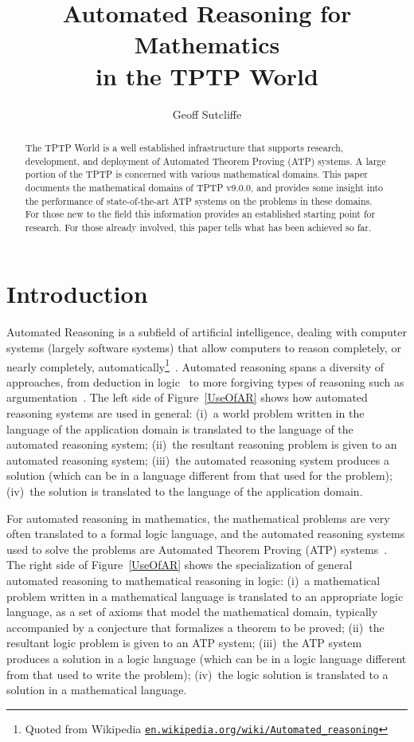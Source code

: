 \documentclass[runningheads]{llncs}
\title{Automated Reasoning for Mathematics \\ in the TPTP World}
\author{
  Geoff Sutcliffe\orcidID{0000-0001-9120-3927}\Envelope
}
\institute{
  University of Miami,
  Miami, USA\\
  \email{geoff@cs.miami.edu}\\
}
\begin{document}
\maketitle

\begin{abstract}
The TPTP World is a well established infrastructure that supports research, development, and 
deployment of Automated Theorem Proving (ATP) systems.
A large portion of the TPTP is concerned with various mathematical domains.
This paper documents the mathematical domains of TPTP v9.0.0, and provides some insight into 
the performance of state-of-the-art ATP systems on the problems in these domains.
For those new to the field this information provides an established starting point for research.
For those already involved, this paper tells what has been achieved so far.
\end{abstract}
\section{Introduction}
\label{Introduction}

Automated Reasoning is a subfield of artificial intelligence, dealing with computer systems
(largely software systems) that allow computers to reason completely, or nearly completely, 
automatically\footnote{%
Quoted from Wikipedia \href{https://en.wikipedia.org/wiki/Automated_reasoning}{{\tt en.wikipedia.org/wiki/Automated\_reasoning}}}~\cite{RV01-HAR}.
Automated reasoning spans a diversity of approaches, from deduction in logic~\cite{Gal15} to more 
forgiving types of reasoning such as argumentation~\cite{vE+14}.
The left side of Figure~\ref{UseOfAR} shows how automated reasoning systems are used in general: 
(i)~a world problem written in the language of the application domain is translated to the language
of the automated reasoning system; (ii)~the resultant reasoning problem is given to an automated 
reasoning system; (iii)~the automated reasoning system produces a solution (which can be in a
language different from that used for the problem); (iv)~the solution is translated to the 
language of the application domain.

For automated reasoning in mathematics, the mathematical problems are very often translated to 
a formal logic language, and the automated reasoning systems used to solve the problems are 
Automated Theorem Proving (ATP) systems~\cite{Bun83,RV01-HAR}.
The right side of Figure~\ref{UseOfAR} shows the specialization of general automated reasoning
to mathematical reasoning in logic:
(i)~a mathematical problem written in a mathematical language is translated to an appropriate 
logic language, as a set of axioms that model the mathematical domain, typically accompanied 
by a conjecture that formalizes a theorem to be proved; (ii)~the resultant logic problem is given 
to an ATP system; (iii)~the ATP system produces a solution in a logic language (which can be 
in a logic language different from that used to write the problem); (iv)~the logic solution is 
translated to a solution in a mathematical language.
\end{document}
